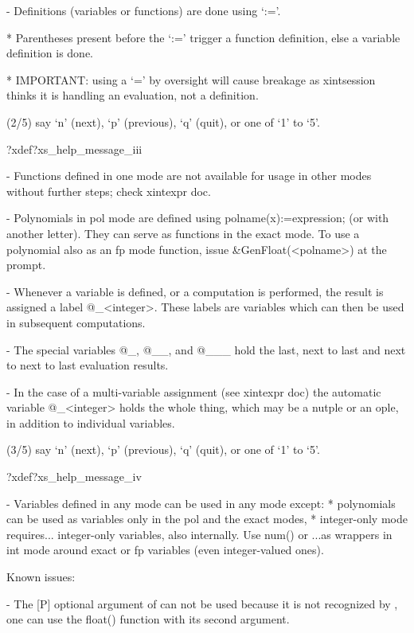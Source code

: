 {{{  - Definitions (variables or functions) are done using `:='.

    *  Parentheses present before the `:=' trigger a function
       definition, else a variable definition is done.

    *  IMPORTANT: using a `=' by oversight will cause breakage as
    xintsession thinks it is handling an evaluation, not a definition.

%    
(2/5) say `n' (next), `p' (previous), `q' (quit), or one of `1' to `5'.
}%
?xdef?xs_help_message_iii{%
  - Functions defined in one mode are not available for usage in
    other modes without further steps; check xintexpr doc.

  - Polynomials in pol mode are defined using polname(x):=expression;
    (or with another letter).  They can serve as functions in the exact
    mode.  To use a polynomial also as an fp mode function, issue
    &GenFloat(<polname>) at the prompt.

  - Whenever a variable is defined, or a computation is performed,
    the result is assigned a label @_<integer>.  These labels are
    variables which can then be used in subsequent computations.

  - The special variables @_, @__, and @___ hold the last, next
    to last and next to next to last evaluation results.

  - In the case of a multi-variable assignment (see xintexpr doc)
    the automatic variable @_<integer> holds the whole thing, which
    may be a nutple or an ople, in addition to individual variables.

(3/5) say `n' (next), `p' (previous), `q' (quit), or one of `1' to `5'.
}%
?xdef?xs_help_message_iv{%
  - Variables defined in any mode can be used in any mode except:
    * polynomials can be used as variables only in the pol and the
      exact modes,
    * integer-only mode requires... integer-only variables, also
      internally.  Use num() or \xintiexpr...\relax as wrappers in int
      mode around exact or fp variables (even integer-valued ones).

  Known issues:

  - The [P] optional argument of \xintfloateval can not be used
    because it is not recognized by \xintdeffloatvar, one can use
    the float() function with its second argument.

}}}
